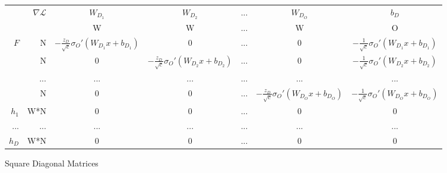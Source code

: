 \begin{adjustwidth}{2000pt}{2000pt}
\begin{table}
\begin{tabular}{r r | c c c c c}
& $\nabla\mathcal{L}$ & $W_{D_1}$ &  $W_{D_2}$  &...&  $W_{D_O}$ & $b_D$ \\
& & W & W &...& W & O \\ \hline
$F$ & N & $-\frac{z_D}{\sqrt{c}}\sigma_O'(W_{D_1}x+b_{D_1})$ & 0 &...& 0 & $-\frac{1}{\sqrt{c}}\sigma_O'(W_{D_1}x+b_{D_1})$ \\
    & N & 0 & $-\frac{z_D}{\sqrt{c}}\sigma_O'(W_{D_2}x+b_{D_2})$ &...& 0 & $-\frac{1}{\sqrt{c}}\sigma_O'(W_{D_2}x+b_{D_2})$ \\
      &...&...&...&...&...&... \\
    & N & 0 & 0 &...& $-\frac{z_D}{\sqrt{c}}\sigma_O'(W_{D_O}x+b_{D_O})$ & $-\frac{1}{\sqrt{c}}\sigma_O'(W_{D_O}x+b_{D_O})$ \\ \hline
$h_1$ & W*N & 0 & 0 &...& 0 & 0 \\
...   & ... &...&...&...&...&...\\ 
$h_{D}$ & W*N & 0 & 0 &...& 0 & 0 \\ \hline
      
\end{tabular}

Square Diagonal Matrices


\end{table}
\end{adjustwidth}
